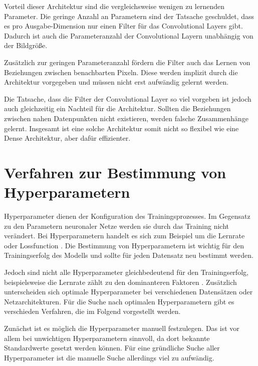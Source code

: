 Vorteil dieser Architektur sind die vergleichsweise wenigen zu lernenden Parameter.
Die geringe Anzahl an Parametern sind der Tatsache geschuldet, dass es pro Ausgabe-Dimension nur einen Filter für das Convolutional Layers gibt.
Dadurch ist auch die Parameteranzahl der Convolutional Layern unabhängig von der Bildgröße.

Zusätzlich zur geringen Parameteranzahl fördern die Filter auch das Lernen von Beziehungen  zwischen benachbarten Pixeln.
Diese werden implizit durch die Architektur vorgegeben und müssen nicht erst aufwändig gelernt werden.
\newline

Die Tatsache, dass die Filter der Convolutional Layer so viel vorgeben ist jedoch auch gleichzeitig ein Nachteil für die Architektur.
Sollten die Beziehungen zwischen nahen Datenpunkten nicht existieren, werden falsche Zusammenhänge gelernt.
Insgesamt ist eine solche Architektur somit nicht so flexibel wie eine Dense Architektur, aber dafür effizienter.

\section{Verfahren zur Bestimmung von Hyperparametern}
\label{chapter:verfahren-bestimmung-hyperparameter}

Hyperparameter dienen der Konfiguration des Trainingsprozesses.
Im Gegensatz zu den Parametern neuronaler Netze werden sie durch das Training nicht verändert.
Bei Hyperparametern handelt es sich zum Beispiel um die Lernrate oder Lossfunction \cite{hyperparameters-gan-using-genetic-algorithm}.
Die Bestimmung von Hyperparametern ist wichtig für den Trainingserfolg des Modells und sollte für jeden Datensatz neu bestimmt werden.


Jedoch sind nicht alle Hyperparameter gleichbedeutend für den Trainingserfolg, beispielsweise die Lernrate zählt zu den dominanteren Faktoren \cite{learning-rate-most-important}.
Zusätzlich unterscheiden sich optimale Hyperparameter bei verschiedenen Datensätzen oder Netzarchitekturen.
Für die Suche nach optimalen Hyperparametern gibt es verschieden Verfahren, die im Folgend vorgestellt werden.

Zunächst ist es möglich die Hyperparameter manuell festzulegen.
Das ist vor allem bei unwichtigen Hyperparametern sinnvoll, da dort bekannte Standardwerte gesetzt werden können.
Für eine gründliche Suche aller Hyperparameter ist die manuelle Suche allerdings viel zu aufwändig.

